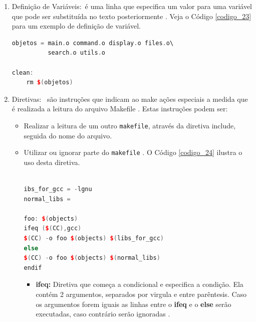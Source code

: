 \begin{enumerate}
\begin{lstlisting}[language=C++,caption={ 
                                     Utilização de padrões no \texttt{makefile}},
                                                        label=codigo_22]
    \end{lstlisting}


    \item Definição de Variáveis:\
 é uma linha que especifica um valor para uma variável que pode ser substituída no
 texto posteriormente \cite[pág. 111]{ref43}. Veja o Código \ref{codigo_23} para um exemplo de 
definição de variável.

    \begin{lstlisting}[language=C++,caption={ 
                                     Definição e utilização de variável},
                                                         label=codigo_23]
objetos = main.o command.o display.o files.o\
          search.o utils.o

clean:
    rm $(objetos)
    \end{lstlisting}


    \item Diretivas: \
são instruções que indicam ao make ações especiais a medida que é realizada a leitura do
 arquivo Makefile \cite[pág. 22]{ref45}. Estas instruções podem ser:

    \begin{itemize}
        \item Realizar a leitura de um outro \texttt{makefile}, através da diretiva include, seguida do nome do arquivo.
        \item Utilizar ou ignorar parte do \texttt{makefile} \cite[pág. 22]{ref43}. O Código \ref{codigo_24} ilustra o uso desta diretiva. 


    \begin{lstlisting}[language=C++,caption={ 
                                      Makefile com diretiva condicional},
                                                         label=codigo_24]

ibs_for_gcc = -lgnu
normal_libs =

foo: $(objects)
ifeq ($(CC),gcc)
$(CC) -o foo $(objects) $(libs_for_gcc)
else
$(CC) -o foo $(objects) $(normal_libs)
endif

    \end{lstlisting}

    \begin{itemize}
        \item \textbf{ifeq:} Diretiva que começa a condicional e especifica a 
    condição. Ela contém 2 argumentos, separados por virgula e entre parêntesis.
     Caso os argumentos forem iguais as linhas entre o \textbf{ifeq} e o
     \textbf{else} serão executadas, caso contrário serão ignoradas \cite[pág. 77]{ref45}.


\end{itemize}
\end{itemize}
\end{enumerate}
